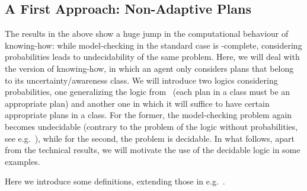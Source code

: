 \subsection{A First Approach: Non-Adaptive Plans}

The results in the above show a huge jump in the computational behaviour of knowing-how: while model-checking in the standard case is \PSPACE-complete, considering probabilities leads to undecidability of the same problem. Here, we will deal with the version of knowing-how, in which an agent only considers plans that belong to its uncertainty/awareness class. We will introduce two logics considering probabilities, one generalizing the logic from~\cite{AFSVQ21,AFSVQ23} (each plan in a class must be an appropriate plan) and another one in which it will suffice to have certain appropriate plans in a class. For the former, the model-checking problem again becomes undecidable (contrary to the \PTIME problem of the logic without probabilities, see e.g.~\cite{AFSVQ21,AFSVQ23,DF23}), while for the second, the problem is decidable. In what follows, apart from the technical results, we will motivate the use of the decidable logic in some examples.

Here we introduce some definitions, extending those in e.g.~\cite{AFSVQ21,AFSVQ23}.


